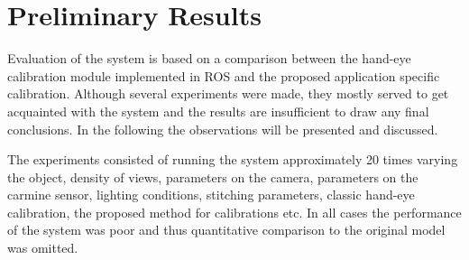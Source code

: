 \chapter{Preliminary Results}
Evaluation of the system is based on a comparison between the hand-eye calibration module implemented in ROS and the proposed application specific calibration. Although several experiments were made, they mostly served to get acquainted with the system and the results are insufficient to draw any final conclusions. In the following the observations will be presented and discussed.

The experiments consisted of running the system approximately 20 times varying the object, density of views, parameters on the camera, parameters on the carmine sensor, lighting conditions, stitching parameters, classic hand-eye calibration, the proposed method for calibrations etc. In all cases the performance of the system was poor and thus quantitative comparison to the original model was omitted. 


